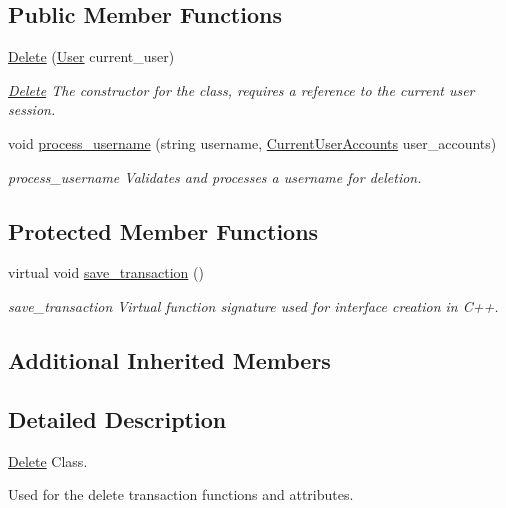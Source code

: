 \subsection*{Public Member Functions}
\begin{DoxyCompactItemize}
\item 
\hyperlink{class_delete_a04541bdc69f519da4e16e59151b236f7}{Delete} (\hyperlink{class_user}{User} current\-\_\-user)
\begin{DoxyCompactList}\small\item\em \hyperlink{class_delete}{Delete} The constructor for the class, requires a reference to the current user session. \end{DoxyCompactList}\item 
void \hyperlink{class_delete_ac47c27071fa4977b64633b429f2d8bc0}{process\-\_\-username} (string username, \hyperlink{class_current_user_accounts}{Current\-User\-Accounts} user\-\_\-accounts)
\begin{DoxyCompactList}\small\item\em process\-\_\-username Validates and processes a username for deletion. \end{DoxyCompactList}\end{DoxyCompactItemize}
\subsection*{Protected Member Functions}
\begin{DoxyCompactItemize}
\item 
virtual void \hyperlink{class_delete_a8e5996ad33eb07eef44f55deba6c298e}{save\-\_\-transaction} ()
\begin{DoxyCompactList}\small\item\em save\-\_\-transaction Virtual function signature used for interface creation in C++. \end{DoxyCompactList}\end{DoxyCompactItemize}
\subsection*{Additional Inherited Members}


\subsection{Detailed Description}
\hyperlink{class_delete}{Delete} Class. 

Used for the delete transaction functions and attributes. 

